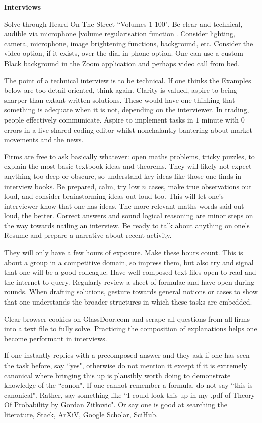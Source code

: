 \textbf{Interviews}

Solve through Heard On The Street ``Volumes $1$-$100$". Be clear and technical, audible via microphone [volume regularisation function]. Consider lighting, camera, microphone, image brightening functions, background, etc. Consider the video option, if it exists, over the dial in phone option. One can use a custom Black background in the Zoom application and perhaps video call from bed.

The point of a technical interview is to be technical. If one thinks the Examples below are too detail oriented, think again. Clarity is valued, aspire to being sharper than extant written solutions. These would have one thinking that something is adequate when it is not, depending on the interviewer. In trading, people effectively communicate. Aspire to implement tasks in $1$ minute with $0$ errors in a live shared coding editor whilst nonchalantly bantering about market movements and the news.

Firms are free to ask basically whatever: open maths problems, tricky puzzles, to explain the most basic textbook ideas and theorems. They will likely not expect anything too deep or obscure, so understand key ideas like those one finds in interview books. Be prepared, calm, try low $n$ cases, make true observations out loud, and consider brainstorming ideas out loud too. This will let one's interviewer know that one has ideas. The more relevant maths words said out loud, the better. Correct answers and sound logical reasoning are minor steps on the way towards nailing an interview. Be ready to talk about anything on one's Resume and prepare a narrative about recent activity.

They will only have a few hours of exposure. Make these hours count. This is about a group in a competitive domain, so impress them, but also try and signal that one will be a good colleague. Have well composed text files open to read and the internet to query. Regularly review a sheet of formulae and have open during rounds. When drafting solutions, gesture towards general notions or cases to show that one understands the broader structures in which these tasks are embedded.

Clear browser cookies on GlassDoor.com and scrape all questions from all firms into a text file to fully solve. Practicing the composition of explanations helps one become performant in interviews.

If one instantly replies with a precomposed answer and they ask if one has seen the task before, say ``yes", otherwise do not mention it except if it is extremely canonical where bringing this up is plausibly worth doing to demonstrate knowledge of the ``canon". If one cannot remember a formula, do not say ``this is canonical". Rather, say something like ``I could look this up in my .pdf of Theory Of Probability by Gordan Zitkovic". Or say one is good at searching the literature, Stack, ArXiV, Google Scholar, SciHub.

